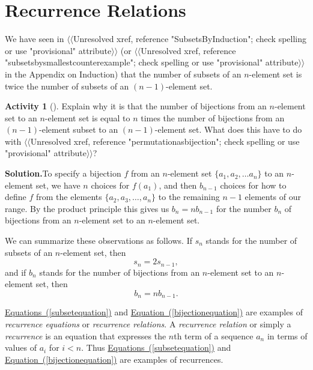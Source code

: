 \documentclass[10pt,]{book}
\theoremstyle{plain}
\theoremstyle{definition}
\newtheorem{activity}[project]{Activity}
\numberwithin{equation}{chapter}
\newcommand{\lt}{<}
\begin{document}
\section[{Recurrence Relations}]{Recurrence Relations}\label{sec_induction-recurrence}
\typeout{************************************************}
\typeout{************************************************}
We have seen in {$\langle\langle$Unresolved xref, reference "SubsetsByInduction"; check spelling or use "provisional" attribute$\rangle\rangle$} (or {$\langle\langle$Unresolved xref, reference "subsetsbysmallestcounterexample"; check spelling or use "provisional" attribute$\rangle\rangle$} in the Appendix on Induction) that the number of subsets of an \(n\)-element set is twice the number of subsets of an \((n-1)\)-element set.%
\begin{activity}[]\label{activity-36}
Explain why it is that the number of bijections from an \(n\)-element set to an \(n\)-element set is equal to \(n\) times the number of bijections from an \((n-1)\)-element subset to an \((n-1)\)-element set. What does this have to do with {$\langle\langle$Unresolved xref, reference "permutationasbijection"; check spelling or use "provisional" attribute$\rangle\rangle$}?%
\par\medskip\noindent%
\textbf{Solution.}\quad To specify a bijection \(f\) from an \(n\)-element set \(\{a_1,a_2,
\ldots a_n\}\) to an \(n\)-element set, we have \(n\) choices for \(f(a_1)\), and then \(b_{n-1}\) choices for how to define \(f\) from the elements \(\{a_2,a_3, \ldots,a_n\}\) to the remaining \(n-1\) elements of our range. By the product principle this gives us \(b_n=nb_{n-1}\) for the number \(b_n\) of bijections from an \(n\)-element set to an \(n\)-element set.%
\end{activity}
We can summarize these observations as follows. If \(s_n\) stands for the number of subsets of an \(n\)-element set, then%
\begin{equation}
s_n =2s_{n-1},\label{subsetequation}
\end{equation}
and if \(b_n\) stands for the number of bijections from an \(n\)-element set to an \(n\)-element set, then%
\begin{equation}
b_n =
nb_{n-1}.\label{bijectionequation}
\end{equation}
%
\par
\hyperref[subsetequation]{Equations~(\ref{subsetequation})} and \hyperref[bijectionequation]{Equation~(\ref{bijectionequation})} are examples of \emph{recurrence equations} or \emph{recurrence relations}. A \emph{recurrence relation} or simply a \emph{recurrence} is an equation that expresses the \(n\)th term of a sequence \(a_n\) in terms of values of \(a_i\) for \(i\lt n\). Thus \hyperref[subsetequation]{Equations~(\ref{subsetequation})} and \hyperref[bijectionequation]{Equation~(\ref{bijectionequation})} are examples of recurrences.%
\typeout{************************************************}
\typeout{************************************************}
\end{document}
